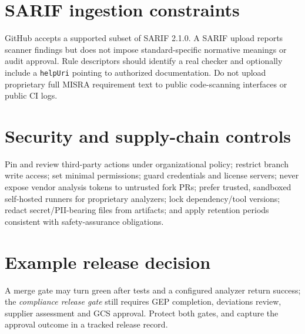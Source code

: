 \documentclass[10pt,letterpaper]{article}
\begin{document}
\section{SARIF ingestion constraints}
GitHub accepts a supported subset of SARIF 2.1.0. A SARIF upload reports scanner findings but does not impose standard-specific normative meanings or audit approval. Rule descriptors should identify a real checker and optionally include a \texttt{helpUri} pointing to authorized documentation. Do not upload proprietary full MISRA requirement text to public code-scanning interfaces or public CI logs.
\section{Security and supply-chain controls}
Pin and review third-party actions under organizational policy; restrict branch write access; set minimal permissions; guard credentials and license servers; never expose vendor analysis tokens to untrusted fork PRs; prefer trusted, sandboxed self-hosted runners for proprietary analyzers; lock dependency/tool versions; redact secret/PII-bearing files from artifacts; and apply retention periods consistent with safety-assurance obligations.
\section{Example release decision}
A merge gate may turn green after tests and a configured analyzer return success; the \emph{compliance release gate} still requires GEP completion, deviations review, supplier assessment and GCS approval. Protect both gates, and capture the approval outcome in a tracked release record.
\end{document}
